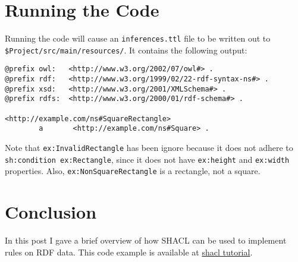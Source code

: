 \documentclass{amsart}
\begin{document}
  
  \section{Running the Code}
  Running the code will cause an \texttt{inferences.ttl} file to be written out to \\\texttt{\$Project/src/main/resources/}. It contains the following output:
  \begin{small}
  \begin{Verbatim} 
@prefix owl:   <http://www.w3.org/2002/07/owl#> .
@prefix rdf:   <http://www.w3.org/1999/02/22-rdf-syntax-ns#> .
@prefix xsd:   <http://www.w3.org/2001/XMLSchema#> .
@prefix rdfs:  <http://www.w3.org/2000/01/rdf-schema#> .

<http://example.com/ns#SquareRectangle>
        a       <http://example.com/ns#Square> .
  \end{Verbatim}
  \end{small}
  Note that \texttt{ex:InvalidRectangle} has been ignore because it does not adhere to \texttt{sh:condition ex:Rectangle}, since it does not have \texttt{ex:height} and \texttt{ex:width} properties. Also, \texttt{ex:NonSquareRectangle} is a rectangle, not a square.

  \section{Conclusion}
  In this post I gave a brief overview of how SHACL can be used to implement rules on RDF data. This code example is available at 
  \href{https://github.com/henrietteharmse/henrietteharmse/tree/master/blog/tutorial/jena/source/shacl}{shacl tutorial}.
  
  
  
  
  
  
  
 
\end{document}
